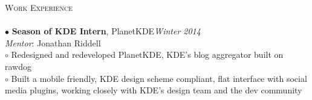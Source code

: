 \documentclass[a4paper,9pt]{article}
\begin{document}
\textcolor{myrust}{\large{\textsc{Work Experience}}}\textcolor{mygray}{\sout{\hfill}}\\\\
\small %
$\bullet$ \textbf{Season of KDE Intern}, PlanetKDE\hfill \textit{Winter 2014}\\
\textit{Mentor}: \textcolor{mydarkgray}{Jonathan Riddell}\\
\hspace*{0.35cm}$\circ$ Redesigned and redeveloped PlanetKDE, KDE’s blog aggregator built on rawdog\\
\hspace*{0.35cm}$\circ$ Built a mobile friendly, KDE design scheme compliant, flat interface with social media plugins, working closely with KDE’s design team and the dev community\\\\

\pagebreak
\end{document}
